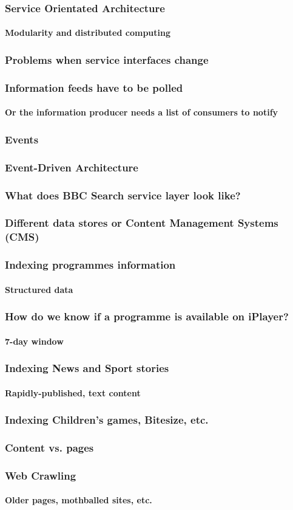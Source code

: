\documentclass{beamer}
\begin{document}
\begin{frame}
  \frametitle{Service Orientated Architecture}
  \framesubtitle{Modularity and distributed computing}
\end{frame}

\begin{frame}
  \frametitle{Problems when service interfaces change}
\end{frame}

\begin{frame}
  \frametitle{Information feeds have to be polled}
  \framesubtitle{Or the information producer needs a list of consumers to notify}
\end{frame}

\begin{frame}
  \frametitle{Events}
\end{frame}

\begin{frame}
  \frametitle{Event-Driven Architecture}
\end{frame}

\begin{frame}
  \frametitle{What does BBC Search service layer look like?}
\end{frame}

\begin{frame}
  \frametitle{Different data stores or Content Management Systems (CMS)}
\end{frame}

\begin{frame}
  \frametitle{Indexing programmes information}
  \framesubtitle{Structured data}
\end{frame}

\begin{frame}
  \frametitle{How do we know if a programme is available on iPlayer?}
  \framesubtitle{7-day window}
\end{frame}

\begin{frame}
  \frametitle{Indexing News and Sport stories}
  \framesubtitle{Rapidly-published, text content}
\end{frame}

\begin{frame}
  \frametitle{Indexing Children's games, Bitesize, etc.}
  \frametitle{Content vs. pages}
\end{frame}

\begin{frame}
  \frametitle{Web Crawling}
  \framesubtitle{Older pages, mothballed sites, etc.}
\end{frame}
\end{document}

